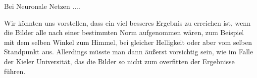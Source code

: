 \documentclass[a4,german]{article}
\begin{document}
Bei Neuronale Netzen .... %

Wir könnten uns vorstellen, dass ein viel besseres Ergebnis zu erreichen ist, wenn die Bilder alle nach einer bestimmten Norm aufgenommen wären, zum Beispiel mit dem selben Winkel zum Himmel, bei gleicher Helligkeit oder aber vom selben Standpunkt aus.
Allerdings müsste man dann äußerst vorsichtig sein, wie im Falle der Kieler Universität, das die Bilder so nicht zum overfitten der Ergebnisse führen.\cite{heinle}



\end{document}
